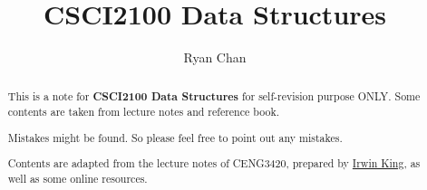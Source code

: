 \documentclass[a4paper]{report}
\author{Ryan Chan}
\title{CSCI2100 Data Structures}
\begin{document}
\setlength\parindent{0pt}

\maketitle

\newpage

\begin{abstract}
	This is a note for \textbf{CSCI2100 Data Structures} for self-revision purpose ONLY. Some contents are taken from lecture notes and reference book.
	
	Mistakes might be found. So please feel free to point out any mistakes.
	
	Contents are adapted from the lecture notes of CENG3420, prepared by \href{https://www.cse.cuhk.edu.hk/irwin.king/}{Irwin King}, as well as some online resources.
\end{abstract}

\newpage

\tableofcontents

\setlength{\parskip}{5pt}
\end{document}
